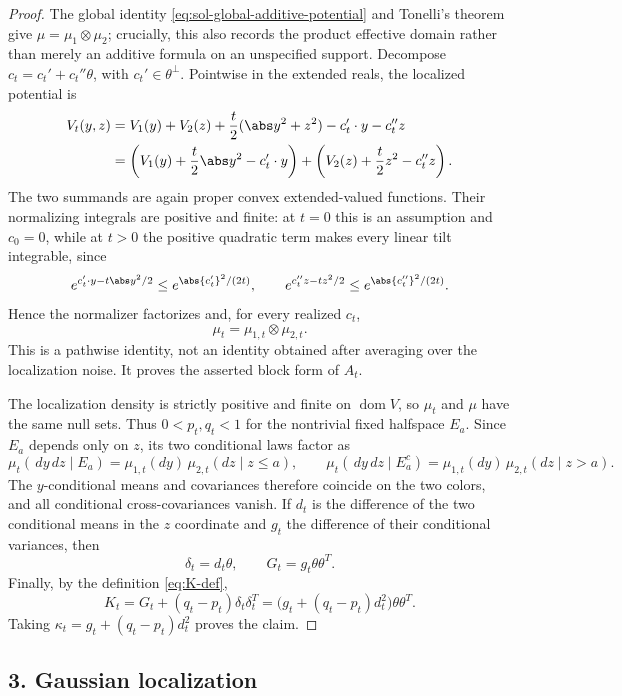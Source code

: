\documentclass[../main.tex]{subfiles}
\begin{document}
\begin{proof}
The global identity \eqref{eq:sol-global-additive-potential} and Tonelli's theorem give
$\mu=\mu_1\otimes\mu_2$; crucially, this also records the product effective domain rather than
merely an additive formula on an unspecified support.  Decompose
$c_t=c_t'+c_t''\theta$, with $c_t'\in\theta^\perp$.  Pointwise in the extended reals, the
localized potential is
\begin{align*}
  V_t(y,z)
  &=V_1(y)+V_2(z)+\frac t2(\abs y^2+z^2)-c_t'\cdot y-c_t''z\\
  &=\left(V_1(y)+\frac t2\abs y^2-c_t'\cdot y\right)
    +\left(V_2(z)+\frac t2z^2-c_t''z\right).
\end{align*}
The two summands are again proper convex extended-valued functions.  Their normalizing integrals
are positive and finite: at $t=0$ this is an assumption and $c_0=0$, while at $t>0$ the positive
quadratic term makes every linear tilt integrable, since
\[
  e^{c_t'\cdot y-t\abs y^2/2}\le e^{\abs{c_t'}^2/(2t)},
  \qquad
  e^{c_t''z-tz^2/2}\le e^{\abs{c_t''}^2/(2t)}.
\]
Hence the normalizer factorizes and, for
every realized $c_t$,
\[
  \mu_t=\mu_{1,t}\otimes\mu_{2,t}.
\]
This is a pathwise identity, not an identity obtained after averaging over the localization
noise.  It proves the asserted block form of $A_t$.

The localization density is strictly positive and finite on $\operatorname{dom}V$, so $\mu_t$
and $\mu$ have
the same null sets.  Thus $0<p_t,q_t<1$ for the nontrivial fixed halfspace $E_a$.  Since $E_a$
depends only on $z$, its two conditional laws factor as
\[
  \mu_t(\,dy\,dz\mid E_a)
     =\mu_{1,t}(dy)\,\mu_{2,t}(dz\mid z\le a),
  \qquad
  \mu_t(\,dy\,dz\mid E_a^c)
     =\mu_{1,t}(dy)\,\mu_{2,t}(dz\mid z>a).
\]
The $y$-conditional means and covariances therefore coincide on the two colors, and all
conditional cross-covariances vanish.  If $d_t$ is the difference of the two conditional means
in the $z$ coordinate and $g_t$ the difference of their conditional variances, then
\[
  \delta_t=d_t\theta,
  \qquad G_t=g_t\theta\theta^T.
\]
Finally, by the definition \eqref{eq:K-def},
\[
  K_t=G_t+(q_t-p_t)\delta_t\delta_t^T
     =\bigl(g_t+(q_t-p_t)d_t^2\bigr)\theta\theta^T.
\]
Taking $\kappa_t=g_t+(q_t-p_t)d_t^2$ proves the claim.
\end{proof}

\subsection*{3. Gaussian localization}
\end{document}
